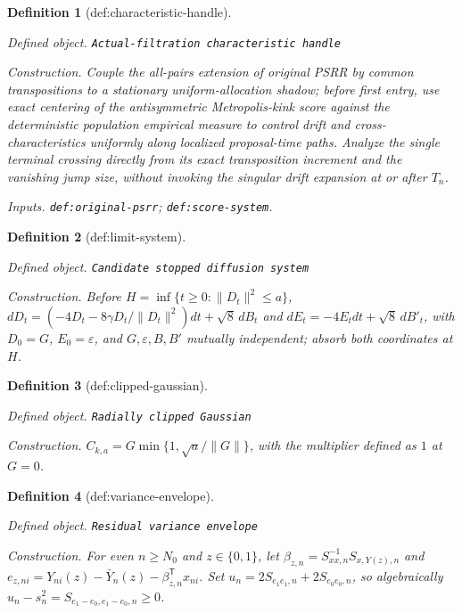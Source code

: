 \documentclass{article}
\newtheorem{definition}{Definition}
\begin{document}
\begin{definition}[def:characteristic-handle]\label{def:characteristic-handle}
\par\smallskip\noindent\emph{Defined object.} \texttt{Actual-\allowbreak{}filtration characteristic handle}
\par\smallskip\noindent\emph{Construction.} Couple the all-pairs extension of original PSRR by common transpositions to a stationary uniform-allocation shadow; before first entry, use exact centering of the antisymmetric Metropolis-kink score against the deterministic population empirical measure to control drift and cross-characteristics uniformly along localized proposal-time paths. Analyze the single terminal crossing directly from its exact transposition increment and the vanishing jump size, without invoking the singular drift expansion at or after \(T_n\).
\par\smallskip\noindent\emph{Inputs.} \texttt{def:\allowbreak{}original-\allowbreak{}psrr}; \texttt{def:\allowbreak{}score-\allowbreak{}system}.
\end{definition}

\begin{definition}[def:limit-system]\label{def:limit-system}
\par\smallskip\noindent\emph{Defined object.} \texttt{Candidate stopped diffusion system}
\par\smallskip\noindent\emph{Construction.} Before \(H=\inf\{t\ge0:\|D_t\|^2\le a\}\), \(dD_t=(-4D_t-8\gamma D_t/\|D_t\|^2)dt+\sqrt8\,dB_t\) and \(dE_t=-4E_tdt+\sqrt8\,dB'_t\), with \(D_0=G\), \(E_0=\varepsilon\), and \(G,\varepsilon,B,B'\) mutually independent; absorb both coordinates at \(H\).
\end{definition}

\begin{definition}[def:clipped-gaussian]\label{def:clipped-gaussian}
\par\smallskip\noindent\emph{Defined object.} \texttt{Radially clipped Gaussian}
\par\smallskip\noindent\emph{Construction.} \(C_{k,a}=G\min\{1,\sqrt a/\|G\|\}\), with the multiplier defined as \(1\) at \(G=0\).
\end{definition}

\begin{definition}[def:variance-envelope]\label{def:variance-envelope}
\par\smallskip\noindent\emph{Defined object.} \texttt{Residual variance envelope}
\par\smallskip\noindent\emph{Construction.} For even \(n\ge N_0\) and \(z\in\{0,1\}\), let \(\beta_{z,n}=S_{xx,n}^{-1}S_{x,Y(z),n}\) and \(e_{z,ni}=Y_{ni}(z)-\bar Y_n(z)-\beta_{z,n}^{\mathsf T}x_{ni}\). Set \(u_n=2S_{e_1e_1,n}+2S_{e_0e_0,n}\), so algebraically \(u_n-s_n^2=S_{e_1-e_0,e_1-e_0,n}\ge0\).
\end{definition}
\end{document}
